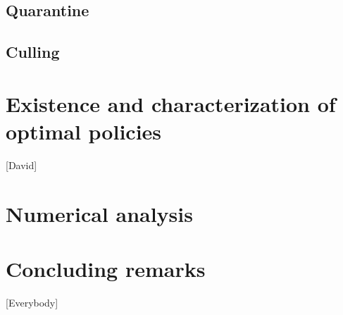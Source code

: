 \documentclass[a4paper]{amsart}
\begin{document}
	    \subsection{Quarantine}
	    	
	    \subsection{Culling}
	    	
	\section{Existence and characterization of optimal policies}
		[David]
	\section{Numerical analysis}
		
	\section{Concluding remarks}
		[Everybody]
%
	
	
\end{document}
